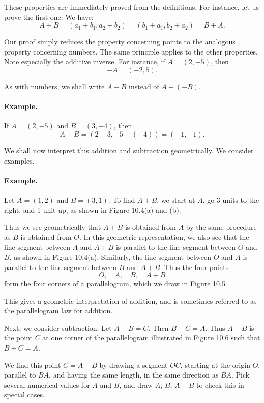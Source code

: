 \documentclass[12pt]{book} %
\begin{document}
These properties are immediately proved from the definitions. For instance, let us prove the first one. We have:
\[
A+B=(a_1+b_1,a_2+b_2)=(b_1+a_1,b_2+a_2)=B+A.
\]

Our proof simply reduces the property concerning points to the analogous property concerning numbers. The same principle applies to the other properties. Note especially the additive inverse. For instance, if $A=(2,-5)$, then
\[
-A=(-2,5).
\]

As with numbers, we shall write $A-B$ instead of $A+(-B)$.

\paragraph{Example.}
If $A=(2,-5)$ and $B=(3,-4)$, then
\[
A-B=(2-3,-5-(-4))=(-1,-1).
\]

We shall now interpret this addition and subtraction geometrically. We consider examples.

\paragraph{Example.}
Let $A=(1,2)$ and $B=(3,1)$. To find $A+B$, we start at $A$, go 3 units to the right, and 1 unit up, as shown in Figure 10.4(a) and (b).


Thus we see geometrically that $A+B$ is obtained from $A$ by the same procedure as $B$ is obtained from $O$. In this geometric representation, we also see that the line segment between $A$ and $A+B$ is parallel to the line segment between $O$ and $B$, as shown in Figure 10.4(a). Similarly, the line segment between $O$ and $A$ is parallel to the line segment between $B$ and $A+B$. Thus the four points
\[
O,\quad A,\quad B,\quad A+B
\]
form the four corners of a parallelogram, which we draw in Figure 10.5.


This gives a geometric interpretation of addition, and is sometimes referred to as the parallelogram law for addition.

Next, we consider subtraction. Let $A-B=C$. Then $B+C=A$. Thus $A-B$ is the point $C$ at one corner of the parallelogram illustrated in Figure 10.6 such that $B+C=A$.


We find this point $C=A-B$ by drawing a segment $OC$, starting at the origin $O$, parallel to $BA$, and having the same length, in the same direction as $BA$. Pick several numerical values for $A$ and $B$, and draw $A$, $B$, $A-B$ to check this in special cases.
\end{document}

